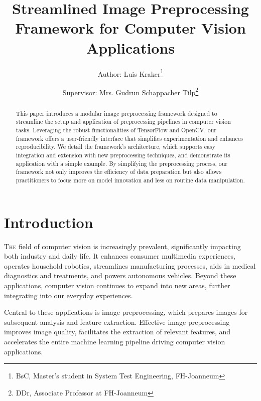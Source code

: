 \documentclass[journal]{new-aiaa}
\title{Streamlined Image Preprocessing Framework for Computer Vision Applications %
}
\author{Author: Luis Kraker\footnote{BsC, Master's student in System Test Engineering, FH-Joanneum}}
\affil{FH-Joanneum, Graz 8020, Austria}
\author{Supervisor: Mrs. Gudrun Schappacher Tilp\footnote{DDr, Associate Professor at FH-Joanneum}}
\affil{FH-Joanneum, Graz 8020, Austria}
\begin{document}
\maketitle

\begin{abstract}
This paper introduces a modular image preprocessing framework designed to streamline the setup and application of preprocessing pipelines in computer vision tasks. Leveraging the robust functionalities of TensorFlow and OpenCV, our framework offers a user-friendly interface that simplifies experimentation and enhances reproducibility. We detail the framework's architecture, which supports easy integration and extension with new preprocessing techniques, and demonstrate its application with a simple example. By simplifying the preprocessing process, our framework not only improves the efficiency of data preparation but also allows practitioners to focus more on model innovation and less on routine data manipulation.
\end{abstract}


\section{Introduction}
\lettrine{T}{he} field of computer vision is increasingly prevalent, significantly impacting both industry and daily life. It enhances consumer multimedia experiences, operates household robotics, streamlines manufacturing processes, aids in medical diagnostics and treatments, and powers autonomous vehicles.\cite{bebis2002review} Beyond these applications, computer vision continues to expand into new areas, further integrating into our everyday experiences.\cite{szeliski2010computer}


Central to these applications is image preprocessing, which prepares images for subsequent analysis and feature extraction.\cite{gonzalez2002digital} Effective image preprocessing improves image quality, facilitates the extraction of relevant features, and accelerates the entire machine learning pipeline driving computer vision applications.\cite{nelson2020image}\cite{krig2014image}
\end{document}
